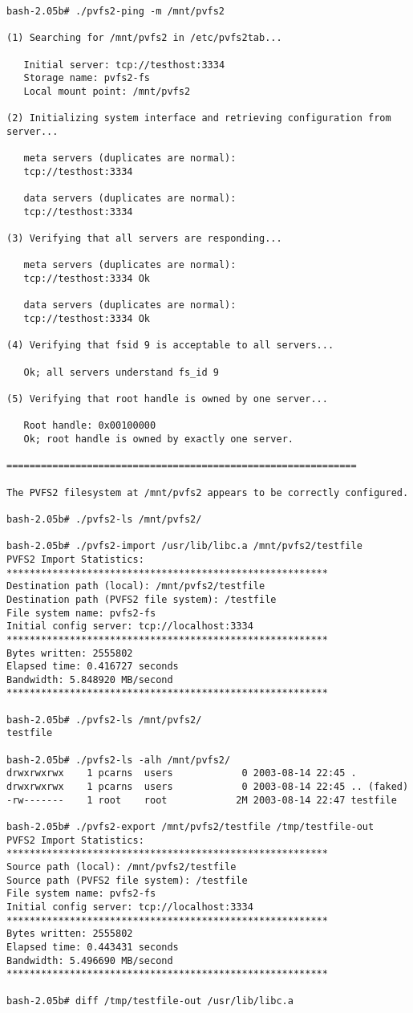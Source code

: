 \documentclass[11pt, letterpaper]{article}
\begin{document}
\begin{verbatim}
bash-2.05b# ./pvfs2-ping -m /mnt/pvfs2

(1) Searching for /mnt/pvfs2 in /etc/pvfs2tab...

   Initial server: tcp://testhost:3334
   Storage name: pvfs2-fs
   Local mount point: /mnt/pvfs2

(2) Initializing system interface and retrieving configuration from server...

   meta servers (duplicates are normal):
   tcp://testhost:3334

   data servers (duplicates are normal):
   tcp://testhost:3334

(3) Verifying that all servers are responding...

   meta servers (duplicates are normal):
   tcp://testhost:3334 Ok

   data servers (duplicates are normal):
   tcp://testhost:3334 Ok

(4) Verifying that fsid 9 is acceptable to all servers...

   Ok; all servers understand fs_id 9

(5) Verifying that root handle is owned by one server...

   Root handle: 0x00100000
   Ok; root handle is owned by exactly one server.

=============================================================

The PVFS2 filesystem at /mnt/pvfs2 appears to be correctly configured.

bash-2.05b# ./pvfs2-ls /mnt/pvfs2/

bash-2.05b# ./pvfs2-import /usr/lib/libc.a /mnt/pvfs2/testfile
PVFS2 Import Statistics:
********************************************************
Destination path (local): /mnt/pvfs2/testfile
Destination path (PVFS2 file system): /testfile
File system name: pvfs2-fs
Initial config server: tcp://localhost:3334
********************************************************
Bytes written: 2555802
Elapsed time: 0.416727 seconds
Bandwidth: 5.848920 MB/second
********************************************************

bash-2.05b# ./pvfs2-ls /mnt/pvfs2/
testfile

bash-2.05b# ./pvfs2-ls -alh /mnt/pvfs2/
drwxrwxrwx    1 pcarns  users            0 2003-08-14 22:45 .
drwxrwxrwx    1 pcarns  users            0 2003-08-14 22:45 .. (faked)
-rw-------    1 root    root            2M 2003-08-14 22:47 testfile

bash-2.05b# ./pvfs2-export /mnt/pvfs2/testfile /tmp/testfile-out
PVFS2 Import Statistics:
********************************************************
Source path (local): /mnt/pvfs2/testfile
Source path (PVFS2 file system): /testfile
File system name: pvfs2-fs
Initial config server: tcp://localhost:3334
********************************************************
Bytes written: 2555802
Elapsed time: 0.443431 seconds
Bandwidth: 5.496690 MB/second
********************************************************

bash-2.05b# diff /tmp/testfile-out /usr/lib/libc.a
\end{verbatim}
\end{document}
